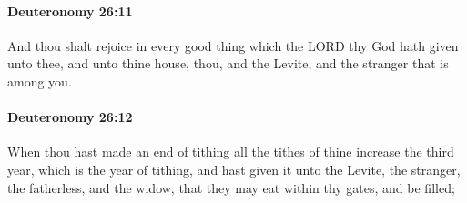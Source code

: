 		\paragraph{Deuteronomy 26:11} %
			\label{DEUTERONOMY-26-11}

			And thou shalt rejoice in every good thing which the LORD thy God hath given unto thee, and unto thine house, thou, and the Levite, and the stranger that is among you.


		\paragraph{Deuteronomy 26:12} %
			\label{DEUTERONOMY-26-12}

			When thou hast made an end of tithing all the tithes of thine increase the third year, which is the year of tithing, and hast given it unto the Levite, the stranger, the fatherless, and the widow, that they may eat within thy gates, and be filled;

